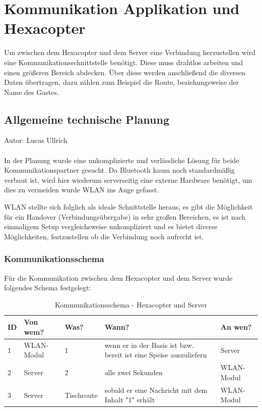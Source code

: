 \chapter{Kommunikation Applikation und Hexacopter}
\renewcommand{\kapitelautor}{Autor: Katharina Joksch, Lucas Ullrich}
Um zwischen dem Hexacopter und dem Server eine Verbindung herzustellen wird eine Kommunikationsschnittstelle benötigt. Diese muss drahtlos arbeiten und einen größeren Bereich
abdecken. Über diese werden anschließend die diversen Daten übertragen, dazu zählen zum Beispiel die Route, beziehungsweise der Name des Gastes.

\section{Allgemeine technische Planung}
Autor: Lucas Ullrich\\ \\
In der Planung wurde eine unkomplizierte und verlässliche Lösung für beide Kommunikationspartner gesucht. Da Bluetooth kaum noch standardmäßig verbaut ist, wird hier wiederum
serverseitig eine externe Hardware benötigt, um dies zu vermeiden wurde WLAN ins Auge gefasst.

WLAN stellte sich folglich als ideale Schnittstelle heraus,
es gibt die Möglichkeit für ein Handover (Verbindungsübergabe) in sehr großen Bereichen, es ist nach einmaligem Setup vergleichsweise unkompliziert und es bietet diverse
Möglichkeiten, festzustellen ob die Verbindung noch aufrecht ist.

      \subsection{Kommunikationsschema}
Für die Kommunikation zwischen dem Hexacopter und dem Server wurde folgendes Schema festgelegt:
\begin{table}[H]
\centering
\begin{tabular}{|p{0.5cm}|p{2cm}|p{2cm}|p{5.5cm}|p{2cm}|}
\hline \textbf{ID} & \textbf{Von wem?} & \textbf{Was?} & \textbf{Wann?} & \textbf{An wen?} \\\hline
\hline 1 & WLAN-Modul & 1 & wenn er in der Basis ist bzw. \newline bereit ist eine Speise auszuliefern & Server \\\hline
\hline 2 & Server & 2 & alle zwei Sekunden & WLAN-Modul \\\hline
\hline 3 & Server & Tischroute & sobald er eine Nachricht mit dem Inhalt "1" erhält & WLAN-Modul \\\hline
\end{tabular}
\caption{Kommunikationsschema - Hexacopter und Server}
\end{table}

